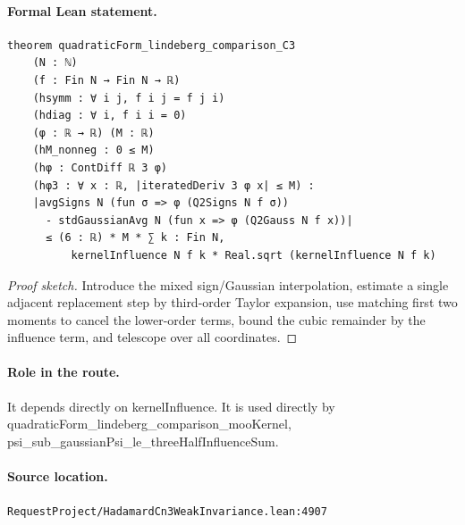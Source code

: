 \medskip
\paragraph{Formal Lean statement.}
\begin{verbatim}
theorem quadraticForm_lindeberg_comparison_C3
    (N : ℕ)
    (f : Fin N → Fin N → ℝ)
    (hsymm : ∀ i j, f i j = f j i)
    (hdiag : ∀ i, f i i = 0)
    (φ : ℝ → ℝ) (M : ℝ)
    (hM_nonneg : 0 ≤ M)
    (hφ : ContDiff ℝ 3 φ)
    (hφ3 : ∀ x : ℝ, |iteratedDeriv 3 φ x| ≤ M) :
    |avgSigns N (fun σ => φ (Q2Signs N f σ))
      - stdGaussianAvg N (fun x => φ (Q2Gauss N f x))|
      ≤ (6 : ℝ) * M * ∑ k : Fin N,
          kernelInfluence N f k * Real.sqrt (kernelInfluence N f k)
\end{verbatim}
\begin{proof}[Proof sketch]
Introduce the mixed sign/Gaussian interpolation, estimate a single adjacent replacement step by third-order Taylor expansion, use matching first two moments to cancel the lower-order terms, bound the cubic remainder by the influence term, and telescope over all coordinates.
\end{proof}
\paragraph{Role in the route.}
It depends directly on kernelInfluence. It is used directly by quadraticForm\_lindeberg\_comparison\_mooKernel, psi\_sub\_gaussianPsi\_le\_threeHalfInfluenceSum.
\paragraph{Source location.}
\texttt{RequestProject/HadamardCn3WeakInvariance.lean:4907}
\medskip
